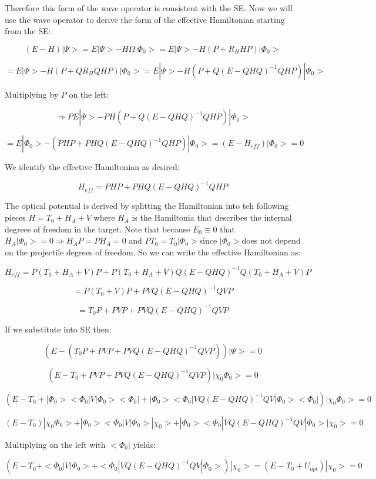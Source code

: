 \documentclass[fleqn, 12pt]{article}
\begin{document}
\begin{enumerate}
Therefore this form of the wave operator is consistent with the SE.
Now we will use the wave operator to derive the form of the effective
Hamiltonian starting from the SE:

\[
\left(E-H\right)|\Psi>=E|\Psi>-H\Omega|\Phi_{0}>=E|\Psi>-H\left(P+R_{H}HP\right)|\Phi_{0}>
\]


\[
=E|\Psi>-H\left(P+QR_{H}QHP\right)|\Phi_{0}>=E|\Psi>-H\left(P+Q(E-QHQ)^{-1}QHP\right)|\Phi_{0}>
\]


Multiplying by $P$ on the left:

\[
\Rightarrow PE|\Psi>-PH\left(P+Q(E-QHQ)^{-1}QHP\right)|\Phi_{0}>
\]


\[
=E|\Phi_{0}>-(PHP+PHQ(E-QHQ)^{-1}QHP)|\Phi_{0}>=\left(E-H_{eff}\right)|\Phi_{0}>=0
\]


We identify the effective Hamiltonian as desired:

\[
H_{eff}=PHP+PHQ(E-QHQ)^{-1}QHP
\]


The optical potential is derived by splitting the Hamiltonian into
teh following pieces $H=T_{0}+H_{A}+V$ where $H_{A}$ is the Hamiltonia
that describes the internal degrees of freedom in the target. Note
that because $E_{0}\equiv0$ that$H_{A}|\Phi_{0}>=0\Rightarrow H_{A}P=PH_{A}=0$
and $PT_{0}=T_{0}|\Phi_{0}>$since $|\Phi_{0}>$does not depend on
the projectile degrees of freedom. So we can write the effective Hamiltonian
as:

\[
H_{eff}=P\left(T_{0}+H_{A}+V\right)P+P\left(T_{0}+H_{A}+V\right)Q(E-QHQ)^{-1}Q\left(T_{0}+H_{A}+V\right)P
\]


\[
=P\left(T_{0}+V\right)P+PVQ(E-QHQ)^{-1}QVP
\]


\[
=T_{0}P+PVP+PVQ(E-QHQ)^{-1}QVP
\]


If we substitute into SE then:

\[
\left(E-\left(T_{0}P+PVP+PVQ(E-QHQ)^{-1}QVP\right)\right)|\Psi>=0
\]


\[
\left(E-T_{0}+PVP+PVQ(E-QHQ)^{-1}QVP\right)|\chi_{0}\Phi_{0}>=0
\]


\[
\left(E-T_{0}+|\Phi_{0}><\Phi_{0}|V|\Phi_{0}><\Phi_{0}|+|\Phi_{0}><\Phi_{0}|VQ(E-QHQ)^{-1}QV|\Phi_{0}><\Phi_{0}|\right)|\chi_{0}\Phi_{0}>=0
\]


\[
\left(E-T_{0}\right)|\chi_{0}\Phi_{0}>+|\Phi_{0}><\Phi_{0}|V|\Phi_{0}>|\chi_{0}>+|\Phi_{0}><\Phi_{0}|VQ(E-QHQ)^{-1}QV|\Phi_{0}>|\chi_{0}>=0
\]


Multiplying on the left with $<\Phi_{0}|$ yields:

\[
\left(E-T_{0}+<\Phi_{0}|V|\Phi_{0}>+<\Phi_{0}|VQ(E-QHQ)^{-1}QV|\Phi_{0}>\right)|\chi_{0}>=\left(E-T_{0}+U_{opt}\right)|\chi_{0}>=0
\]



\end{enumerate}
\end{document}
